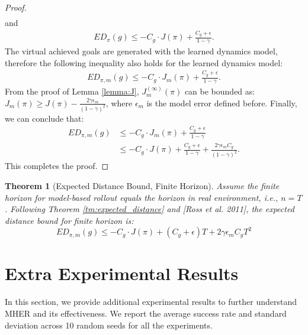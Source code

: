 \documentclass{article}
\newtheorem{theorem}{Theorem}
\begin{document}
\begin{proof}
\begin{equation*}
\begin{aligned}
        \end{aligned}
    \end{equation*}
    and 
    \begin{equation*}
        \begin{aligned}
            ED_\pi (g)  \leq  -C_g \cdot J(\pi) +  \frac{C_g+\epsilon}{1-\gamma} .
        \end{aligned}
    \end{equation*}
    The virtual achieved goals are generated with the learned dynamics model, therefore the following inequality also holds for the learned dynamics model:
    \begin{equation*}
        \begin{aligned}
            ED_{\pi,m}(g)  \leq -C_g \cdot J_m(\pi) +  \frac{C_g+\epsilon}{1-\gamma} .
        \end{aligned}
    \end{equation*}
    From the proof of Lemma \ref{lemma:J}, $J^{(\infty)}_m(\pi)$ can be bounded as: $J_m(\pi) \geq J(\pi) - \frac{2\gamma \epsilon_m}{(1-\gamma)^2}$, where $\epsilon_m$ is the model error defined before.
    Finally, we can conclude that:
    \begin{equation*}
        \begin{aligned}
            ED_{\pi,m}(g) &\leq -C_g \cdot J_m(\pi) +  \frac{C_g+\epsilon}{1-\gamma}  \\
            &\leq -C_g \cdot J(\pi) +  \frac{C_g+\epsilon}{1-\gamma} + \frac{2\gamma \epsilon_m C_g}{(1-\gamma)^2} .
        \end{aligned}
    \end{equation*}
    This completes the proof.
\end{proof}

\begin{theorem}[Expected Distance Bound, Finite Horizon]
    Assume the finite horizon for model-based rollout equals the horizon in real environment, i.e., $n=T$. Following Theorem \ref{tm:expected_distance} and [Ross et al. 2011], the expected distance bound for finite horizon is:
     \begin{equation*}
        ED_{\pi,m}(g) \leq -C_g \cdot J(\pi) +  (C_g+\epsilon)T + 2\gamma \epsilon_m C_g T^2
    \end{equation*}
\end{theorem}




\section{Extra Experimental Results}
\label{ap:extra_experiment}
In this section, we provide additional experimental results to further understand MHER and its effectiveness. We report the average success rate and standard deviation across 10 random seeds for all the experiments.
\end{document}
